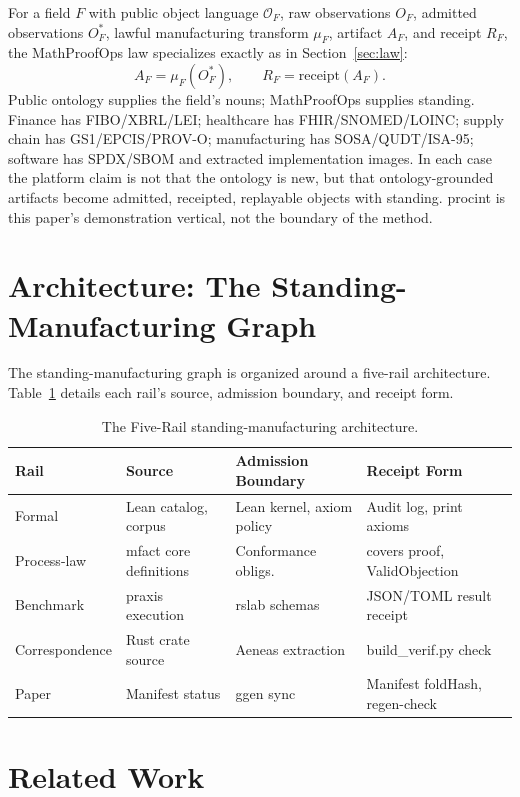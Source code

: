 \documentclass[11pt]{article}
\begin{document}
For a field \(F\) with public object language \(\mathcal{O}_F\), raw
observations \(O_F\), admitted observations \(O^*_F\), lawful
manufacturing transform \(\mu_F\), artifact \(A_F\), and receipt \(R_F\),
the MathProofOps law specializes exactly as in Section~\ref{sec:law}:
\[
A_F = \mu_F(O^*_F), \qquad R_F = \mathrm{receipt}(A_F).
\]
Public ontology supplies the field's nouns; MathProofOps supplies
standing. Finance has FIBO/XBRL/LEI; healthcare has FHIR/SNOMED/LOINC;
supply chain has GS1/EPCIS/PROV-O; manufacturing has SOSA/QUDT/ISA-95;
software has SPDX/SBOM and extracted implementation images. In each case
the platform claim is not that the ontology is new, but that
ontology-grounded artifacts become admitted, receipted, replayable objects
with standing. \textsf{procint} is this paper's demonstration vertical,
not the boundary of the method.

\section{Architecture: The Standing-Manufacturing Graph}
\label{sec:architecture}

The standing-manufacturing graph is organized around a five-rail architecture. Table~\ref{tab:rails} details each rail's source, admission boundary, and receipt form.

\begin{table}[h]
\centering
\small
\begin{tabular}{llll}
\toprule
Rail & Source & Admission Boundary & Receipt Form \\
\midrule
Formal & Lean catalog, corpus & Lean kernel, axiom policy & Audit log, print axioms \\
Process-law & mfact core definitions & Conformance obligs. & covers proof, ValidObjection \\
Benchmark & praxis execution & rslab schemas & JSON/TOML result receipt \\
Correspondence & Rust crate source & Aeneas extraction & build\_verif.py check \\
Paper & Manifest status & ggen sync & Manifest foldHash, regen-check \\
\bottomrule
\end{tabular}
\caption{The Five-Rail standing-manufacturing architecture.}
\label{tab:rails}
\end{table}

\section{Related Work}
\end{document}
